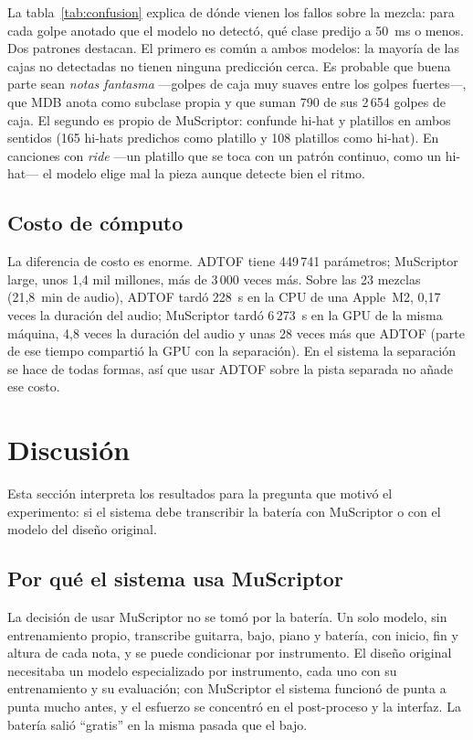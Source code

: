 \documentclass[11pt,a4paper]{article}
\begin{document}
La tabla~\ref{tab:confusion} explica de dónde vienen los fallos sobre la mezcla: para cada golpe anotado
que el modelo no detectó, qué clase predijo a 50~ms o menos. Dos patrones destacan. El primero es común
a ambos modelos: la mayoría de las cajas no detectadas no tienen ninguna predicción cerca. Es probable
que buena parte sean \emph{notas fantasma} ---golpes de caja muy suaves entre los golpes fuertes---, que
MDB anota como subclase propia y que suman 790 de sus 2\,654 golpes de caja. El segundo es propio de MuScriptor: confunde hi-hat y platillos en
ambos sentidos (165 hi-hats predichos como platillo y 108 platillos como hi-hat). En canciones con
\emph{ride} ---un platillo que se toca con un patrón continuo, como un hi-hat--- el modelo elige mal la
pieza aunque detecte bien el ritmo.

\begin{table}[ht]
\centering
\caption{Golpes no detectados sobre la mezcla (23 canciones) y qué predijo el modelo a 50~ms o menos de
cada uno. ``Nada'' significa que el modelo no predijo ningún golpe cerca.}
\label{tab:confusion}
\small

\end{table}

\subsection{Costo de cómputo}
La diferencia de costo es enorme. ADTOF tiene 449\,741 parámetros; MuScriptor large, unos 1{,}4 mil
millones, más de 3\,000 veces más. Sobre las 23 mezclas (21{,}8~min de audio), ADTOF tardó 228~s en la CPU
de una Apple~M2, 0{,}17 veces la duración del audio; MuScriptor tardó 6\,273~s en la GPU de la misma
máquina, 4{,}8 veces la duración del audio y unas 28 veces más que ADTOF (parte de ese tiempo compartió la
GPU con la separación). En el sistema la separación se hace de todas formas, así que usar ADTOF sobre la
pista separada no añade ese costo.

\section{Discusión}

Esta sección interpreta los resultados para la pregunta que motivó el experimento: si el sistema debe
transcribir la batería con MuScriptor o con el modelo del diseño original.

\subsection{Por qué el sistema usa MuScriptor}
La decisión de usar MuScriptor no se tomó por la batería. Un solo modelo, sin entrenamiento propio,
transcribe guitarra, bajo, piano y batería, con inicio, fin y altura de cada nota, y se puede condicionar
por instrumento. El diseño original necesitaba un modelo especializado por instrumento, cada uno con su
entrenamiento y su evaluación; con MuScriptor el sistema funcionó de punta a punta mucho antes, y el
esfuerzo se concentró en el post-proceso y la interfaz. La batería salió ``gratis'' en la misma pasada
que el bajo.
\end{document}
